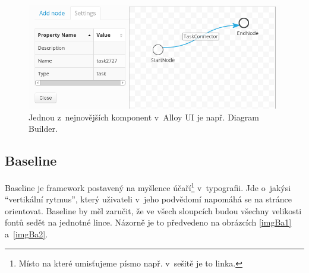 \documentclass[thesis=B,czech]{FITthesis}[2012/06/26]
\begin{document}
\begin{figure}[h]
	\begin{center}
	\includegraphics[scale=0.7]{images/image13.png}
	\end{center}
	\caption[Alloy UI komponenta]{Jednou z~nejnovějších komponent v~Alloy UI je např. Diagram Builder.}
	\label{imgAlloy}
\end{figure}

\newpage
\subsection{Baseline}

Baseline je framework postavený na myšlence účaří\footnote{Místo na které umisťujeme písmo např. v~sešitě je to linka.} v~typografii. Jde o~jakýsi “vertikální rytmus”, který uživateli v~jeho podvědomí napomáhá se na stránce orientovat. Baseline by měl zaručit, že ve všech sloupcích budou všechny velikosti fontů sedět na jednotné lince. Názorně je to předvedeno na obrázcích \ref{imgBa1} a~\ref{imgBa2}. 
\end{document}
